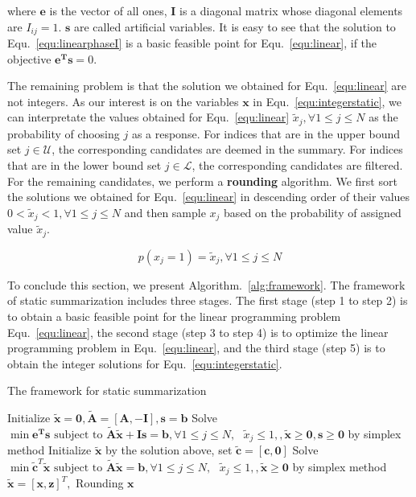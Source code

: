 \documentclass[envcountsame]{llncs}
\begin{document}
where $\mathbf{e}$ is the vector of all ones, $\mathbf{I}$ is a diagonal matrix whose diagonal elements are $I_{ij}=1$. $\mathbf{s}$ are called artificial variables. It is easy to see that the solution to Equ.~\ref{equ:linearphaseI} is a basic feasible point for Equ.~\ref{equ:linear}, if the objective $\mathbf{e^{T}s}=0 $.

The remaining problem is that the solution we obtained for Equ.~\ref{equ:linear} are not integers. As our interest is on the variables $\mathbf{x}$ in Equ.~\ref{equ:integerstatic}, we can interpretate the values obtained for Equ.~\ref{equ:linear} $\tilde{x}_j, \forall 1\leq j\leq N $ as the probability of choosing $j$ as a response. For indices that are in the upper bound set $j \in \mathcal{U}$, the corresponding candidates are deemed in the summary. For indices that are in the lower bound set $j \in \mathcal{L}$, the corresponding candidates are filtered. For the remaining candidates, we perform a \textbf{rounding} algorithm. We first sort the solutions we obtained for Equ.~\ref{equ:linear} in descending order of their values $0< \tilde{x}_j< 1,\forall 1\leq j\leq N$ and then sample $x_j$ based on the probability of assigned value $\tilde{x}_j$.

\vspace{-0.3cm}
\begin{equation}
p(x_j=1)= \tilde{x}_j, \forall 1\leq j \leq N
\end{equation}
\vspace{-0.6cm}

To conclude this section, we present Algorithm.~\ref{alg:framework}. The framework of static summarization includes three stages. The first stage (step 1 to step 2) is to obtain a basic feasible point for the linear programming problem Equ.~\ref{equ:linear}, the second stage (step 3 to step 4) is to optimize the linear programming problem in Equ.~\ref{equ:linear}, and the third stage (step 5) is to obtain the integer solutions for Equ.~\ref{equ:integerstatic}.

\vspace{-0.6cm}
\begin{algorithm}\label{alg:framework}
\caption{The framework for static summarization}

Initialize $\tilde{\mathbf{x}}=\mathbf{0},\tilde{\mathbf{A}}=[\mathbf{A},-\mathbf{I}],\mathbf{s}=\mathbf{b}$\;
Solve $\min \mathbf{e^{T}s} \textrm{ subject to } \tilde{\mathbf{A}}\tilde{\mathbf{x}} + \mathbf{Is} = \mathbf{b},  \forall 1\leq j\leq N,\textrm{ } \tilde{x}_j \leq 1, ,\tilde{\mathbf{x}}\geq \mathbf{0}, \mathbf{s}\geq \mathbf{0}$ by simplex method\;
Initialize $\tilde{\mathbf{x}}$ by the solution above, set $\tilde{\mathbf{c}}=[\mathbf{c},\mathbf{0}]$  \;
Solve $\min \tilde{\mathbf{c}}^T \tilde{\mathbf{x}}\textrm{ subject to } \tilde{\mathbf{A}}\tilde{\mathbf{x}} = \mathbf{b}, \forall 1\leq j\leq N,\textrm{ } \tilde{x}_j \leq 1, ,\tilde{\mathbf{x}}\geq \mathbf{0}$ by simplex method\;
$\tilde{\mathbf{x}}=[\mathbf{x},\mathbf{z}]^T,$ Rounding $\mathbf{x}$\;
\end{algorithm}
\vspace{-0.8cm}
\end{document}
